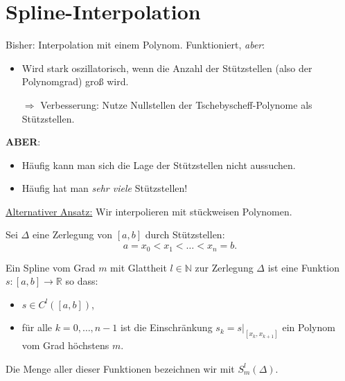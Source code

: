 




\section{Spline-Interpolation}

 Bisher: Interpolation mit einem Polynom. Funktioniert, \emph{aber}:
\begin{itemize}
  \item Wird stark oszillatorisch, wenn die Anzahl der Stützstellen (also der Polynomgrad) groß wird.
  \item[$\Rightarrow$] Verbesserung: Nutze Nullstellen der Tschebyscheff-Polynome als Stützstellen.
\end{itemize}

\textbf{ABER}:
\begin{itemize}
  \item Häufig kann man sich die Lage der  Stützstellen nicht aussuchen.
  \item Häufig hat man \emph{sehr viele} Stützstellen!
\end{itemize}

\underline{Alternativer Ansatz:} Wir interpolieren mit stückweisen Polynomen.

\bigskip

Sei $\Delta$ eine Zerlegung von $\left[a, b\right]$ durch Stützstellen: 
\begin{equation*}
 a = x_0<x_1<\dots < x_n=b.
\end{equation*}

\begin{defi}
  Ein Spline vom Grad $m$ mit Glattheit $l\in \mathbb{N}$ zur Zerlegung $\Delta$ ist eine Funktion $s:\left[a, b\right] \rightarrow \mathbb{R}$ so dass:
  \begin{itemize}
    \item $s \in C^l([a, b])$,
    \item für alle $k=0, \dots, n-1$ ist die Einschränkung $s_k = s|_{[x_k, x_{k+1}]}$ ein Polynom vom Grad höchstens $m$.
  \end{itemize}
  Die Menge aller dieser Funktionen bezeichnen wir mit $S_m^l(\Delta)$. 
\end{defi}

